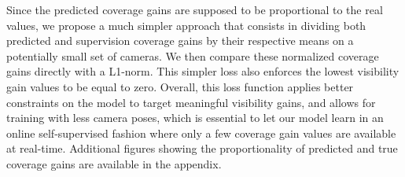 Since the predicted coverage gains are supposed to be proportional to the real values, we propose a much simpler approach that consists in dividing both predicted and supervision coverage gains by their respective means on a potentially small set of cameras. We then compare these normalized coverage gains directly with a L1-norm. This simpler loss also enforces the lowest visibility gain values to be equal to zero. Overall, this loss function applies better constraints on the model to target meaningful visibility gains, and allows for training with less camera poses, which is essential to let our model learn in an online self-supervised fashion where only a few coverage gain values are available at real-time. Additional figures showing the proportionality of predicted and true coverage gains are available in the appendix.